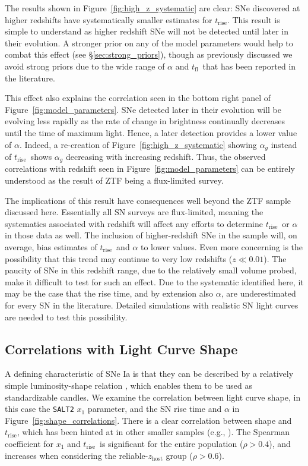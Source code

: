 \documentclass[twocolumn]{aastex63}
\newcommand{\tfl}{$t_\mathrm{fl}$}
\newcommand{\trise}{$t_\mathrm{rise}$}
\begin{document}
The results shown in Figure~\ref{fig:high_z_systematic} are clear: SNe
discovered at higher redshifts have systematically smaller estimates for
\trise. This result is simple to understand as higher redshift SNe will not be
detected until later in their evolution. A stronger prior on any of the model
parameters would help to combat this effect (see \S\ref{sec:strong_priors}),
though as previously discussed we avoid strong priors due to the wide range of
$\alpha$ and \tfl\ that has been reported in the literature. 

This effect also explains the correlation seen in the bottom right panel of
Figure~\ref{fig:model_parameters}. SNe detected later in their evolution will
be evolving less rapidly as the rate of change in brightness continually
decreases until the time of maximum light. Hence, a later detection provides a
lower value of $\alpha$. Indeed, a re-creation of
Figure~\ref{fig:high_z_systematic} showing $\alpha_g$ instead of \trise\ shows
$\alpha_g$ decreasing with increasing redshift. Thus, the observed
correlations with redshift seen in Figure~\ref{fig:model_parameters} can be
entirely understood as the result of ZTF being a flux-limited survey.

The implications of this result have consequences well beyond the ZTF sample
discussed here. Essentially all SN surveys are flux-limited, meaning the
systematics associated with redshift will affect any efforts to determine
\trise\ or $\alpha$ in those data as well. The inclusion of higher-redshift
SNe in the sample will, on average, bias estimates of \trise\ and $\alpha$ to
lower values. Even more concerning is the possibility that this trend may
continue to very low redshifts ($z \ll 0.01$). The paucity of SNe in this
redshift range, due to the relatively small volume probed, make it difficult
to test for such an effect. Due to the systematic identified here, it may be
the case that the rise time, and by extension also $\alpha$, are
underestimated for every SN in the literature. Detailed simulations with
realistic SN light curves are needed to test this possibility.

\subsection{Correlations with Light Curve Shape}

A defining characteristic of SNe Ia is that they can be described by a
relatively simple luminosity-shape relation \citep{Phillips93}, which enables
them to be used as standardizable candles. We examine the correlation between
light curve shape, in this case the \texttt{SALT2} $x_1$ parameter, and the SN
rise time and $\alpha$ in Figure~\ref{fig:shape_correlations}. There is a clear
correlation between shape and \trise, which has been hinted at in other smaller
samples (e.g., \citealt{Riess99a,Firth15,Zheng17a}). The Spearman coefficient
for $x_1$ and \trise\ is significant for the entire population ($\rho > 0.4$),
and increases when considering the reliable-$z_\mathrm{host}$ group ($\rho >
0.6$).
\end{document}
